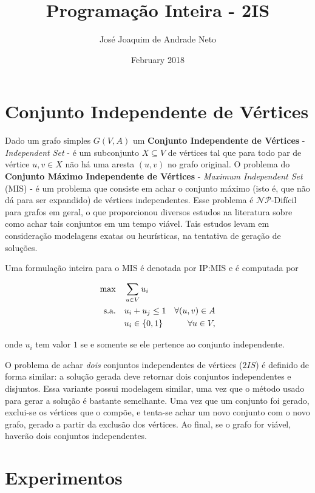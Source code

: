 \documentclass[12pt]{article}
\title{Programação Inteira - 2IS}
\author{José Joaquim de Andrade Neto}
\date{February 2018}
\begin{document}
\maketitle

\section{Conjunto Independente de Vértices}

Dado um grafo simples $G(V, A)$ um \textbf{Conjunto Independente de Vértices} - \textit{Independent Set} - é um subconjunto $X \subseteq V$ de vértices tal que para todo par de vértice $u, v \in X$ não há uma aresta $(u, v)$ no grafo original. 
O problema do \textbf{Conjunto Máximo Independente de Vértices} - \textit{Maximum Independent Set} (MIS) - é um problema que consiste em achar o conjunto máximo (isto é, que não dá para ser expandido) de vértices independentes. 
Esse problema é $\mathcal{NP}$-Difícil para grafos em geral, o que proporcionou diversos estudos na literatura sobre como achar tais conjuntos em um tempo viável. Tais estudos levam em consideração modelagens exatas ou heurísticas, na tentativa de geração de soluções.

Uma formulação inteira para o MIS é denotada por IP:MIS e é computada por

\begin{align*}	
  \max\quad        & \sum_{u \in V} u_i                                                          \\
  \text{s.a.\quad} & u_i + u_j \leq 1 &  \forall (u, v) \in A  								 \\
  				   & u_i \in \{0, 1\} & \forall u \in V,
\end{align*}

\noindent
onde $u_i$ tem valor $1$ se e somente se ele pertence ao conjunto independente.

O problema de achar \textsl{dois} conjuntos independentes de vértices ($2IS$) é definido de forma similar: a solução gerada deve retornar dois conjuntos independentes e disjuntos. 
Essa variante possui modelagem similar, uma vez que o método usado para gerar a solução é bastante semelhante. 
Uma vez que um conjunto foi gerado, exclui-se os vértices que o compõe, e tenta-se achar um novo conjunto com o novo grafo, gerado a partir da exclusão dos vértices. Ao final, se o grafo for viável, haverão dois conjuntos independentes.

\section{Experimentos}
\end{document}
